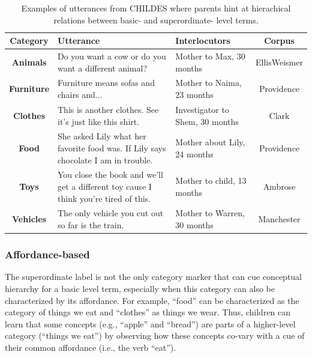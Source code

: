 \documentclass[english,,man]{apa6}
\begin{document}
\begin{table}[!htbp] \centering 

\caption{\label{tab:pragmatic} Examples of utterances from CHILDES where parents hint at hierachical relations between basic- and superordinate- level terms.}

\begin{tabularx}{\linewidth}{cXXc}
\hline
\textbf{Category} & Utterance & Interlocutors & Corpus\\
\hline

\textbf{Animals} & Do you want a cow or do you want a different animal? & Mother to Max, 30 months & EllisWeismer\\

\textbf{Furniture} & Furniture means sofas and chairs and... & Mother to Naima, 23 months & Providence\\

\textbf{Clothes} & This is another clothes. See it's just like this shirt. & Investigator to Shem, 30 months & Clark\\

\textbf{Food} & She asked Lily what her favorite food was. If Lily says chocolate I am in trouble. & Mother about Lily, 24 months & Providence\\

\textbf{Toys} & You close the book and we'll get a different toy cause I think you're tired of this. & Mother to child, 13 months & Ambrose\\

\textbf{Vehicles} & The only vehicle you cut out so far is the train. & Mother to Warren, 30 months & Manchester\\

\hline
\end{tabularx}

\end{table}

\hypertarget{affordance-based}{%
\subsubsection{Affordance-based}\label{affordance-based}}

The superordinate label is not the only category marker that can cue conceptual hierarchy for a basic level term, especially when this category can also be characterized by its affordance. For example, \enquote{food} can be characterized as the category of things we eat and \enquote{clothes} as things we wear. Thus, children can learn that some concepts (e.g., \enquote{apple} and \enquote{bread}) are parts of a higher-level category (\enquote{things we eat}) by observing how these concepts co-vary with a cue of their common affordance (i.e., the verb \enquote{eat}).
\end{document}
